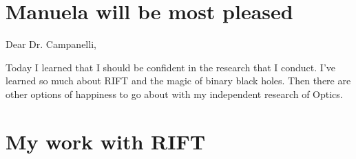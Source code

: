 \section{Manuela will be most pleased}

Dear Dr. Campanelli, 

Today I learned that I should be confident in the research that I conduct. I've learned so much about RIFT and the magic of binary black holes. Then there are other options of happiness to go about with my independent research of Optics. 
\section{My work with RIFT}